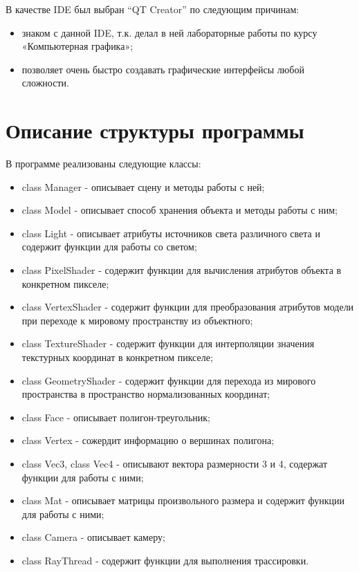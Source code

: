 \documentclass[12pt,a4paper,oneside]{report}
\begin{document}
	 В качестве IDE был выбран “QT Creator” по следующим причинам: 
	
	\begin{itemize}
		\item знаком с данной IDE, т.к. делал в ней лабораторные работы по курсу «Компьютерная графика»;
		\item позволяет очень быстро создавать графические интерфейсы любой сложности.
	\end{itemize}

	\section{Описание структуры программы}
	 \quad В программе реализованы следующие классы:
	\begin{itemize}
		\item class Manager - описывает сцену и методы работы с ней;
		\item class Model - описывает способ хранения объекта и методы работы с ним;
		\item class Light - описывает атрибуты источников света различного света и содержит функции для работы со светом;
		\item class PixelShader - содержит функции для вычисления атрибутов объекта в конкретном пикселе;
		\item class VertexShader - содержит функции для преобразования атрибутов модели при переходе к мировому пространству из объектного;
		\item class TextureShader - содержит функции для интерполяции значения текстурных координат в конкретном пикселе;
		\item class GeometryShader - содержит функции для перехода из мирового пространства в пространство нормализованных координат;
		\item class Face - описывает полигон-треугольник;
		\item class Vertex - сожердит информацию о вершинах полигона;
		\item class Vec3, class Vec4 - описывают вектора размерности 3 и 4, содержат функции для работы с ними;
		\item class Mat -  описывает матрицы произвольного размера и содержит функции для работы с ними;
		\item class Camera - описывает камеру;
		\item class RayThread - содержит функции для выполнения трассировки.
	\end{itemize}
\end{document}
